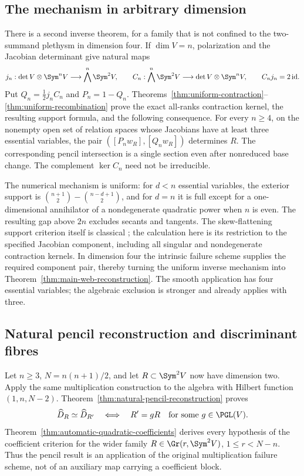 \subsection{The mechanism in arbitrary dimension}

There is a second inverse theorem, for a family that is not confined
to the two-summand plethysm in dimension four.  If \(\dim V=n\),
polarization and the Jacobian determinant give natural maps
\[
 j_n:\det V\otimes\Sym^nV\longrightarrow\bigwedge^n\Sym^2V,
 \qquad C_n:\bigwedge^n\Sym^2V\longrightarrow\det V\otimes\Sym^nV,
 \qquad C_nj_n=2\,\mathrm{id}.
\]
Put \(Q_n=\frac12j_nC_n\) and \(P_n=1-Q_n\).
Theorems~\ref{thm:uniform-contraction}--\ref{thm:uniform-recombination}
prove the exact all-ranks contraction kernel, the resulting support
formula, and the following consequence.  For every \(n\ge4\), on
the nonempty open set of relation spaces whose Jacobians have at
least three essential variables, the pair
\(([P_nw_R],[Q_nw_R])\) determines \(R\).  The corresponding
pencil intersection is a single section even after nonreduced base
change.  The complement \(\ker C_n\) need not be irreducible.

The numerical mechanism is uniform: for \(d<n\) essential variables,
the exterior support is
\(\binom{n+1}{2}-\binom{n-d+1}{2}\), and for \(d=n\) it is full
except for a one-dimensional annihilator of a nondegenerate quadratic
power when \(n\) is even.  The resulting gap above \(2n\) excludes
secants and tangents.  The skew-flattening support criterion itself
is classical \cite{LandsbergOttaviani,Sheridan}; the calculation here
is its restriction to the specified Jacobian component, including
all singular and nondegenerate contraction kernels.  In dimension
four the intrinsic failure scheme supplies the required component
pair, thereby turning the uniform inverse mechanism into
Theorem~\ref{thm:main-web-reconstruction}.  The smooth application
has four essential variables; the algebraic exclusion is stronger
and already applies with three.

\subsection{Natural pencil reconstruction and discriminant fibres}

Let \(n\ge3\), \(N=n(n+1)/2\), and let
\(R\subset\Sym^2V\) now have dimension two.  Apply the same
multiplication construction to the algebra with Hilbert function
\((1,n,N-2)\).  Theorem~\ref{thm:natural-pencil-reconstruction}
proves
\[
 \widehat D_R\simeq\widehat D_{R'}\quad\Longleftrightarrow\quad
                  R'=gR\quad\text{for some }g\in\PGL(V).
\]
Theorem~\ref{thm:automatic-quadratic-coefficients} derives every
hypothesis of the coefficient criterion for the wider family
\(R\in\Gr(r,\Sym^2V)\), \(1\le r<N-n\).  Thus the
pencil result is an application of the original multiplication
failure scheme, not of an auxiliary map carrying a coefficient block.

